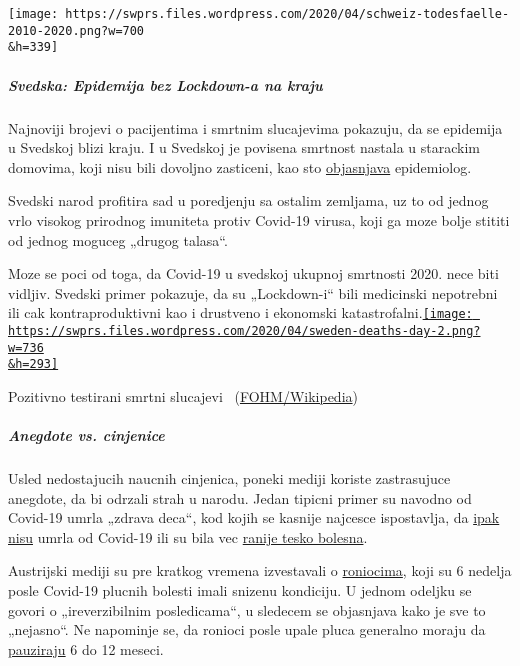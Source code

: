 \texttt{[image: https://swprs.files.wordpress.com/2020/04/schweiz-todesfaelle-2010-2020.png?w=700\\\&h=339]}

\hypertarget{svedska-epidemija-bez-lockdown-a-na-kraju}{%
\subparagraph{\texorpdfstring{\textbf{Svedska: Epidemija bez Lockdown-a
na
kraju}}{Svedska: Epidemija bez Lockdown-a na kraju}}\label{svedska-epidemija-bez-lockdown-a-na-kraju}}

Najnoviji brojevi o pacijentima i smrtnim slucajevima pokazuju, da se
epidemija u Svedskoj blizi kraju. I u Svedskoj je povisena smrtnost
nastala u starackim domovima, koji nisu bili dovoljno zasticeni, kao sto
\href{https://www.washingtontimes.com/news/2020/apr/15/sweden-coronavirus-rates-easing-despite-loose-rule/}{objasnjava}
epidemiolog.

Svedski narod profitira sad u poredjenju sa ostalim zemljama, uz to od
jednog vrlo visokog prirodnog imuniteta protiv Covid-19 virusa, koji ga
moze bolje stititi od jednog moguceg „drugog talasa``.

Moze se poci od toga, da Covid-19 u svedskoj ukupnoj smrtnosti 2020.
nece biti vidljiv. Svedski primer pokazuje, da su „Lockdown-i`` bili
medicinski nepotrebni ili cak kontraproduktivni kao i drustveno i
ekonomski
katastrofalni.\href{https://swprs.files.wordpress.com/2020/04/sweden-deaths-day-2.png}{\texttt{[image: https://swprs.files.wordpress.com/2020/04/sweden-deaths-day-2.png?w=736\\\&h=293]}}

Pozitivno testirani smrtni slucajevi~
(\href{https://en.wikipedia.org/wiki/2020_coronavirus_pandemic_in_Sweden\#Charts7be6f9f87457ed9aa}{FOHM/Wikipedia})

\hypertarget{anegdote-vs-cinjenice}{%
\subparagraph{\texorpdfstring{\textbf{Anegdote vs.
cinjenice}}{Anegdote vs. cinjenice}}\label{anegdote-vs-cinjenice}}

Usled nedostajucih naucnih cinjenica, poneki mediji koriste zastrasujuce
anegdote, da bi odrzali strah u narodu. Jedan tipicni primer su navodno
od Covid-19 umrla „zdrava deca``, kod kojih se kasnije najcesce
ispostavlja, da
\href{https://www.dailymail.co.uk/news/article-8193487/Coroner-refuses-rule-COVID-19-cause-death-six-week-old-Connecticut-baby.html}{ipak
nisu} umrla od Covid-19 ili su bila vec
\href{https://www.msn.com/de-ch/news/other/spanischer-nachwuchs-trainer-stirbt-an-corona/ar-BB11gT64}{ranije
tesko bolesna}.

Austrijski mediji su pre kratkog vremena izvestavali o
\href{https://www.rainews.it/tgr/tagesschau/articoli/2020/04/tag-Coronavirus-Lungeschaden-Forschung-Uniklinik-Innsbruck-6708e11e-28dc-4843-a760-e7f926ace61c.html}{roniocima},
koji su 6 nedelja posle Covid-19 plucnih bolesti imali snizenu
kondiciju. U jednom odeljku se govori o „ireverzibilnim posledicama``, u
sledecem se objasnjava kako je sve to „nejasno``. Ne napominje se, da
ronioci posle upale pluca generalno moraju da
\href{https://www.gesundheitsfrage.net/g/frage/tauchen-lungenentzuendung}{pauziraju}
6 do 12 meseci.

